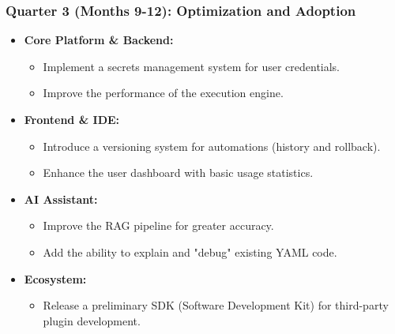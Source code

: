 \subsubsection*{Quarter 3 (Months 9-12): Optimization and Adoption}
\begin{itemize}[leftmargin=*]
    \item \textbf{Core Platform \& Backend:}
    \begin{itemize}
        \item Implement a secrets management system for user credentials.
        \item Improve the performance of the execution engine.
    \end{itemize}
    \item \textbf{Frontend \& IDE:}
    \begin{itemize}
        \item Introduce a versioning system for automations (history and rollback).
        \item Enhance the user dashboard with basic usage statistics.
    \end{itemize}
    \item \textbf{AI Assistant:}
    \begin{itemize}
        \item Improve the RAG pipeline for greater accuracy.
        \item Add the ability to explain and "debug" existing YAML code.
    \end{itemize}
    \item \textbf{Ecosystem:}
    \begin{itemize}
        \item Release a preliminary SDK (Software Development Kit) for third-party plugin development.
    \end{itemize}
\end{itemize}

